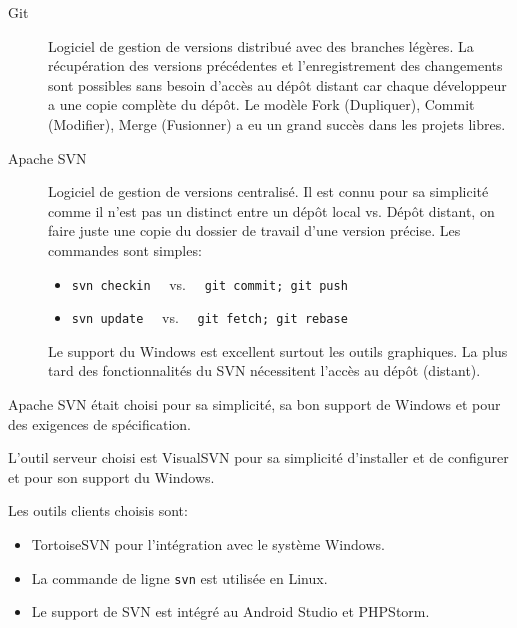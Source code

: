 \begin{description}
    \item [Git] Logiciel de gestion de versions distribué avec des branches
        légères. La récupération des versions précédentes et l'enregistrement
        des changements sont possibles sans besoin d'accès au dépôt distant car
        chaque développeur a une copie complète du dépôt. Le modèle Fork
        (Dupliquer), Commit (Modifier), Merge (Fusionner) a eu un grand succès
        dans les projets libres.
    \item [Apache SVN] Logiciel de gestion de versions centralisé. Il est connu
        pour sa simplicité comme il n'est pas un distinct entre un dépôt local
        vs.  Dépôt distant, on faire juste une copie du dossier de travail
        d'une version précise. Les commandes sont simples:
        \begin{itemize}
            \item \verb|svn checkin| \ \ vs. \ \ \verb|git commit; git push|
            \item \verb|svn update| \ \ vs. \ \ \verb|git fetch; git rebase|
        \end{itemize}
        Le support du Windows est excellent surtout les outils graphiques.  La
        plus tard des fonctionnalités du SVN nécessitent l'accès au dépôt
        (distant).
\end{description}

Apache SVN était choisi pour sa simplicité, sa bon support de Windows et pour
des exigences de spécification. 

L'outil serveur choisi est VisualSVN pour sa simplicité d'installer et de
configurer et pour son support du Windows.

Les outils clients choisis sont:
\begin{itemize}
    \item TortoiseSVN pour l'intégration avec le système Windows.
    \item La commande de ligne \verb|svn| est utilisée en Linux.
    \item Le support de SVN est intégré au Android Studio et PHPStorm.
\end{itemize}


